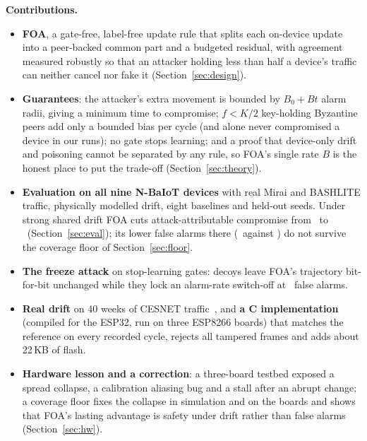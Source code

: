 \textbf{Contributions.}
\begin{itemize}
\item \textbf{FOA}, a gate-free, label-free update rule that splits each on-device update into a
  peer-backed common part and a budgeted residual, with agreement measured robustly so that an attacker
  holding less than half a device's traffic can neither cancel nor fake it (Section~\ref{sec:design}).
\item \textbf{Guarantees}: the attacker's extra movement is bounded by $B_0+Bt$ alarm radii, giving a
  minimum time to compromise; $f<K/2$ key-holding Byzantine peers add only a bounded bias per cycle (and
alone never compromised a device in our runs); no
  gate stops learning; and a proof that device-only drift and poisoning cannot be separated by any
  rule, so FOA's single rate $B$ is the honest place to put the trade-off (Section~\ref{sec:theory}).
\item \textbf{Evaluation on all nine N-BaIoT devices} with real Mirai and BASHLITE traffic, physically
  modelled drift, eight baselines and held-out seeds. Under strong shared drift FOA cuts
  attack-attributable compromise from \AutoComp\ to \FOAComp\ (Section~\ref{sec:eval}); its lower false
  alarms there (\FOAFleetFPR\ against \AutoFleetFPR) do not survive the coverage floor of
  Section~\ref{sec:floor}.
\item \textbf{The freeze attack} on stop-learning gates: decoys leave FOA's trajectory bit-for-bit
  unchanged while they lock an alarm-rate switch-off at \KLFrozenFPR\ false alarms.
\item \textbf{Real drift} on 40 weeks of CESNET traffic~\cite{cesnet}, and \textbf{a C
  implementation} (compiled for the ESP32, run on three ESP8266 boards) that matches the reference on every recorded cycle, rejects all tampered frames and
  adds about 22\,KB of flash.
\item \textbf{Hardware lesson and a correction}: a three-board testbed exposed a spread collapse, a
  calibration aliasing bug and a stall after an abrupt change; a coverage floor fixes the collapse in
  simulation and on the boards and shows that FOA's lasting advantage is safety under drift
  rather than false alarms (Section~\ref{sec:hw}).
\end{itemize}

